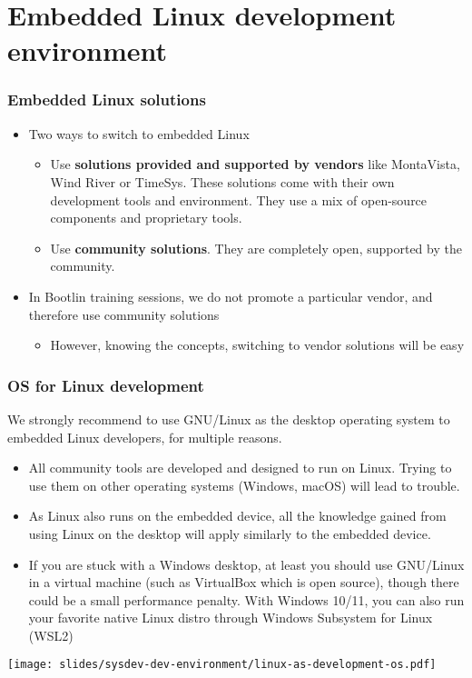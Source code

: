 \section{Embedded Linux development environment}

\begin{frame}
  \frametitle{Embedded Linux solutions}
  \begin{itemize}
  \item Two ways to switch to embedded Linux
    \begin{itemize}
    \item Use {\bf solutions provided and supported by vendors} like
      MontaVista, Wind River or TimeSys. These solutions come with
      their own development tools and environment. They use a mix of
      open-source components and proprietary tools.
    \item Use {\bf community solutions}. They are completely open,
      supported by the community.
    \end{itemize}
  \item In Bootlin training sessions, we do not promote a particular
    vendor, and therefore use community solutions
    \begin{itemize}
    \item However, knowing the concepts, switching to vendor solutions will be easy
    \end{itemize}
  \end{itemize}
\end{frame}

\begin{frame}
  \frametitle{OS for Linux development}
  We strongly recommend to use GNU/Linux as the desktop operating
  system to embedded Linux developers, for multiple reasons.
  \begin{itemize}
  \item All community tools are developed and designed to run on
    Linux. Trying to use them on other operating systems (Windows,
    macOS) will lead to trouble.
  \item As Linux also runs on the embedded device, all the knowledge
    gained from using Linux on the desktop will apply similarly to the
    embedded device.
  \item If you are stuck with a Windows desktop, at least you should
    use GNU/Linux in a virtual machine (such as VirtualBox which is open
    source), though there could be a small performance penalty.
    With Windows 10/11, you can also run your favorite native Linux distro through
    Windows Subsystem for Linux (WSL2)
  \end{itemize}
  \begin{center}
    \texttt{[image: slides/sysdev-dev-environment/linux-as-development-os.pdf]}
  \end{center}
\end{frame}

